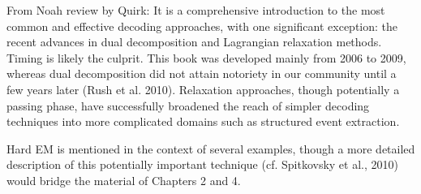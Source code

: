 From Noah review by Quirk: It is a comprehensive introduction to the most common and effective decoding
approaches, with one signiﬁcant exception: the recent advances in dual decomposition
and Lagrangian relaxation methods. Timing is likely the culprit. This book was developed mainly from 2006 to 2009, whereas dual decomposition did not attain notoriety in
our community until a few years later (Rush et al. 2010). Relaxation approaches, though
potentially a passing phase, have successfully broadened the reach of simpler decoding
techniques into more complicated domains such as structured event extraction.

Hard EM is mentioned in the context
of several examples, though a more detailed description of this potentially important
technique (cf. Spitkovsky et al., 2010) would bridge the material of Chapters 2 and 4.
